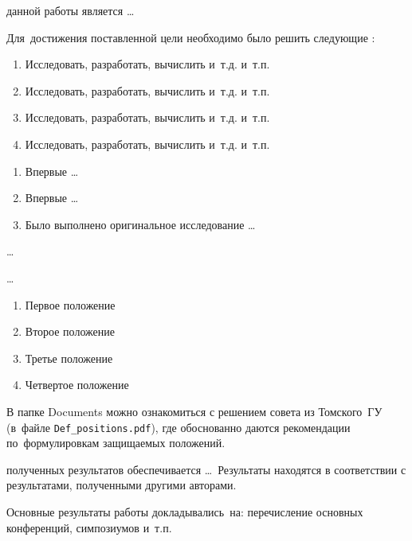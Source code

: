 
{\aim} данной работы является \ldots

Для~достижения поставленной цели необходимо было решить следующие {\tasks}:
\begin{enumerate}[beginpenalty=10000] %
  \item Исследовать, разработать, вычислить и~т.\:д. и~т.\:п.
  \item Исследовать, разработать, вычислить и~т.\:д. и~т.\:п.
  \item Исследовать, разработать, вычислить и~т.\:д. и~т.\:п.
  \item Исследовать, разработать, вычислить и~т.\:д. и~т.\:п.
\end{enumerate}


{\novelty}
\begin{enumerate}[beginpenalty=10000] %
  \item Впервые \ldots
  \item Впервые \ldots
  \item Было выполнено оригинальное исследование \ldots
\end{enumerate}

{\influence} \ldots

{\methods} \ldots

{}
\begin{enumerate}[beginpenalty=10000] %
  \item Первое положение
  \item Второе положение
  \item Третье положение
  \item Четвертое положение
\end{enumerate}
В папке Documents можно ознакомиться с решением совета из Томского~ГУ
(в~файле \verb+Def_positions.pdf+), где обоснованно даются рекомендации
по~формулировкам защищаемых положений.

{\reliability} полученных результатов обеспечивается \ldots \ Результаты находятся в соответствии с результатами, полученными другими авторами.


{\probation}
Основные результаты работы докладывались~на:
перечисление основных конференций, симпозиумов и~т.\:п.

